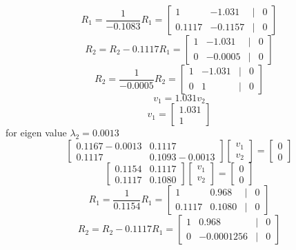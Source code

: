 \documentclass[a3paper,12pt]{extarticle} %
\begin{document}
\begin{enumerate}
\begin{enumerate}
\[            R_1 = \frac{1}{-0.1083}R_1 = \begin{bmatrix}1 & -1.031 & | & 0\\0.1117 & -0.1157 & | & 0\end{bmatrix}
        \]
        \[
            R_2 = R_2 - 0.1117R_1 = \begin{bmatrix}1 & -1.031 & | & 0\\0 & -0.0005 & | & 0\end{bmatrix}
        \]
        \[
        R_2 = \frac{1}{-0.0005}R_2 = \begin{bmatrix}1 & -1.031 & | & 0\\0 & 1 & | & 0\end{bmatrix}
        \]
        \[
        v_1 = 1.031v_2
        \]
        \[
        v_1 = \begin{bmatrix}1.031\\1\end{bmatrix}
        \]
        for eigen value \(\lambda_2 = 0.0013\)
        \[
            \begin{bmatrix}0.1167 - 0.0013 & 0.1117\\0.1117 & 0.1093 - 0.0013\end{bmatrix} \begin{bmatrix}v_1\\v_2\end{bmatrix} = \begin{bmatrix}0\\0\end{bmatrix}
        \]
        \[
            \begin{bmatrix}0.1154 & 0.1117\\0.1117 & 0.1080\end{bmatrix} \begin{bmatrix}v_1\\v_2\end{bmatrix} = \begin{bmatrix}0\\0\end{bmatrix}
        \]
        \[
            R_1 = \frac{1}{0.1154}R_1 = \begin{bmatrix}1 & 0.968 & | & 0\\0.1117 & 0.1080 & | & 0\end{bmatrix}
        \]
        \[
            R_2 = R_2 - 0.1117R_1 = \begin{bmatrix}1 & 0.968 & | & 0\\0 & -0.0001256 & | & 0\end{bmatrix}
        \]
        \[
\]
\end{enumerate}
\end{enumerate}
\end{document}
